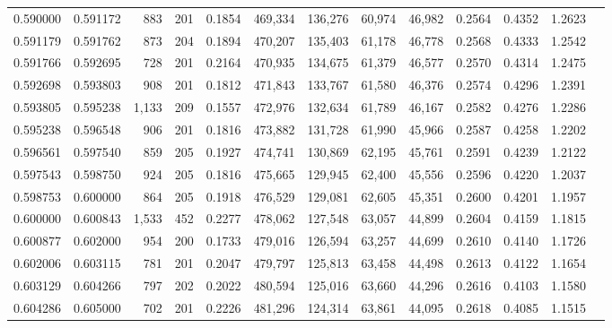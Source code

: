 \begin{tabular}{rrrrrrrrrrrrr}
0.590000 & 0.591172 &    883 &   201 &                                     0.1854 & 469,334 & 136,276 &  60,974 &  46,982 & 0.2564 & 0.4352 & 1.2623 \\
0.591179 & 0.591762 &    873 &   204 &                                     0.1894 & 470,207 & 135,403 &  61,178 &  46,778 & 0.2568 & 0.4333 & 1.2542 \\
0.591766 & 0.592695 &    728 &   201 &                                     0.2164 & 470,935 & 134,675 &  61,379 &  46,577 & 0.2570 & 0.4314 & 1.2475 \\
0.592698 & 0.593803 &    908 &   201 &                                     0.1812 & 471,843 & 133,767 &  61,580 &  46,376 & 0.2574 & 0.4296 & 1.2391 \\
0.593805 & 0.595238 &  1,133 &   209 &                                     0.1557 & 472,976 & 132,634 &  61,789 &  46,167 & 0.2582 & 0.4276 & 1.2286 \\
0.595238 & 0.596548 &    906 &   201 &                                     0.1816 & 473,882 & 131,728 &  61,990 &  45,966 & 0.2587 & 0.4258 & 1.2202 \\
0.596561 & 0.597540 &    859 &   205 &                                     0.1927 & 474,741 & 130,869 &  62,195 &  45,761 & 0.2591 & 0.4239 & 1.2122 \\
0.597543 & 0.598750 &    924 &   205 &                                     0.1816 & 475,665 & 129,945 &  62,400 &  45,556 & 0.2596 & 0.4220 & 1.2037 \\
0.598753 & 0.600000 &    864 &   205 &                                     0.1918 & 476,529 & 129,081 &  62,605 &  45,351 & 0.2600 & 0.4201 & 1.1957 \\
0.600000 & 0.600843 &  1,533 &   452 &                                     0.2277 & 478,062 & 127,548 &  63,057 &  44,899 & 0.2604 & 0.4159 & 1.1815 \\
0.600877 & 0.602000 &    954 &   200 &                                     0.1733 & 479,016 & 126,594 &  63,257 &  44,699 & 0.2610 & 0.4140 & 1.1726 \\
0.602006 & 0.603115 &    781 &   201 &                                     0.2047 & 479,797 & 125,813 &  63,458 &  44,498 & 0.2613 & 0.4122 & 1.1654 \\
0.603129 & 0.604266 &    797 &   202 &                                     0.2022 & 480,594 & 125,016 &  63,660 &  44,296 & 0.2616 & 0.4103 & 1.1580 \\
0.604286 & 0.605000 &    702 &   201 &                                     0.2226 & 481,296 & 124,314 &  63,861 &  44,095 & 0.2618 & 0.4085 & 1.1515 \\

\end{tabular}

